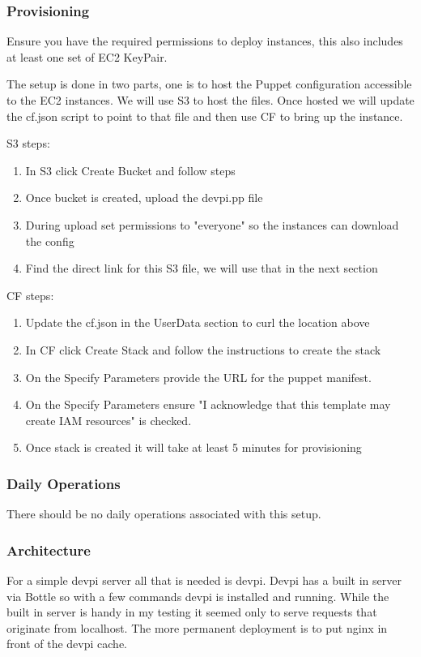 \documentclass[12pt, letterpaper]{article}
\begin{document}
\subsubsection{Provisioning}
Ensure you have the required permissions to deploy instances, this also includes at least one set of EC2 KeyPair.

The setup is done in two parts, one is to host the Puppet configuration accessible to the EC2 instances. We will use
S3 to host the files. Once hosted we will update the cf.json script to point to that file and then use CF to bring
up the instance.

S3 steps:
\begin{enumerate}
    \item In S3 click Create Bucket and follow steps
    \item Once bucket is created, upload the devpi.pp file
    \item During upload set permissions to "everyone" so the instances can download the config
    \item Find the direct link for this S3 file, we will use that in the next section
\end{enumerate}

CF steps:
\begin{enumerate}
    \item Update the cf.json in the UserData section to curl the location above
    \item In CF click Create Stack and follow the instructions to create the stack
    \item On the Specify Parameters provide the URL for the puppet manifest.  
    \item On the Specify Parameters ensure "I acknowledge that this template may create IAM resources" is checked.  
    \item Once stack is created it will take at least 5 minutes for provisioning
\end{enumerate}

\subsubsection{Daily Operations}
There should be no daily operations associated with this setup.


\subsubsection{Architecture}
For a simple devpi server all that is needed is devpi. Devpi has a built in server via Bottle so with a few
commands devpi is installed and running. While the built in server is handy in my testing it seemed only to
serve requests that originate from localhost. The more permanent deployment is to put nginx in front of the
devpi cache.
\end{document}

